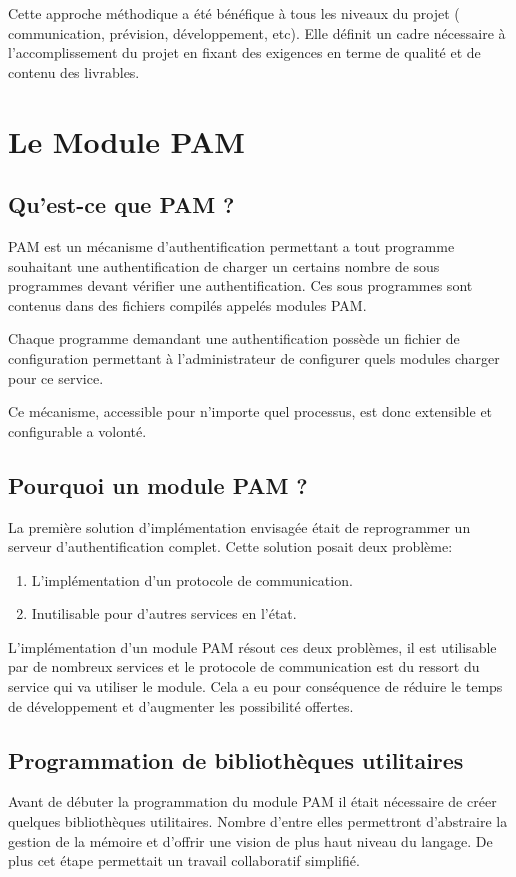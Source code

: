     Cette approche méthodique a été bénéfique à tous les niveaux du projet (
    communication, prévision, développement, etc). Elle définit un cadre
    nécessaire à l'accomplissement du projet en fixant des exigences en terme
    de qualité et de contenu des livrables.


\newpage
\section{Le Module PAM}
\subsection{Qu'est-ce que PAM ?}
PAM est un mécanisme d'authentification permettant a tout programme souhaitant
une authentification de charger un certains nombre de sous programmes devant
vérifier une authentification. Ces sous programmes sont contenus dans des
fichiers compilés appelés modules PAM.

Chaque programme demandant une authentification possède un fichier de configuration permettant à l'administrateur de configurer quels modules charger pour ce service.

Ce mécanisme, accessible pour n'importe quel processus, est donc extensible et configurable a volonté.
\subsection{Pourquoi un module PAM ?}
La première solution d'implémentation envisagée était de reprogrammer un
serveur d'authentification complet. Cette solution posait deux problème:
\begin{enumerate}
  \item L'implémentation d'un protocole de communication.
  \item Inutilisable pour d'autres services en l'état.
\end{enumerate}

L'implémentation d'un module PAM résout ces deux problèmes, il est utilisable
par de nombreux services et le protocole de communication est du ressort du
service qui va utiliser le module. Cela a eu pour conséquence de réduire le
temps de développement et d'augmenter les possibilité offertes.

\subsection{Programmation de bibliothèques utilitaires}
Avant de débuter la programmation du module PAM il était nécessaire de créer
quelques bibliothèques utilitaires. Nombre d'entre elles permettront
d'abstraire la gestion de la mémoire et d'offrir une vision de plus haut niveau
du langage. De plus cet étape permettait un travail collaboratif simplifié.

